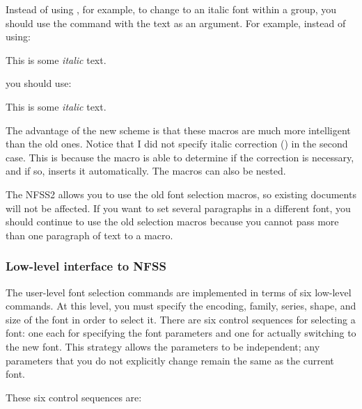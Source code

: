 Instead of using , for example, to change to an italic font within a
group, you should use the  command with the text as an argument.
For example, instead of using:

\begin{shortexample}
This is some {\it italic\/} text.
\end{shortexample}

you should use:

\begin{shortexample}
This is some \textit{italic} text.
\end{shortexample}

The advantage of the new scheme is that these macros are much more
intelligent than the old ones.  Notice that I did not specify italic
correction (\cs{/}) in the second case.  This is because the 
macro is able to determine if the correction is necessary, and if so, inserts it
automatically.  
The macros can also be nested.

The NFSS2 allows you to use the old font selection macros, so existing
documents will not be affected.  If you want to set several paragraphs
in a different font, you should continue to use the old selection
macros because you cannot pass more than one paragraph of text to a
macro.

\subsubsection{Low-level interface to NFSS}

The user-level font selection commands are implemented in terms of six
low-level commands.  At this level, you must specify the encoding, family,
series, shape, and size of the font in order to select it.  There are six
control sequences for selecting a font: one each for specifying the font
parameters and one for actually switching to the new font.  This strategy
allows the parameters to be independent; any parameters that you do not 
explicitly change remain the same as the current font.

These six control sequences are:


